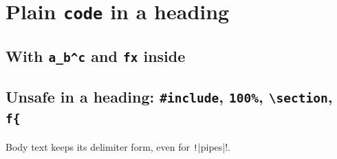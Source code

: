 \section{Plain \texttt{code} in a heading}

\subsection{With \texttt{a_b^c} and \texttt{f{x}} inside}

\subsection{Unsafe in a heading: \texttt{\#include}, \texttt{100\%}, \texttt{\textbackslash{}section}, \texttt{f\{}}

Body text keeps its delimiter form, even for \texttt!|pipes|!.

